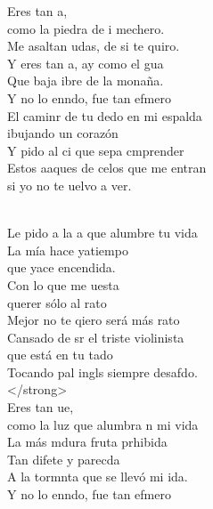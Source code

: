 \begin{cancion}%
	Eres tan a, \\
	como la piedra de i mechero.\\
	Me asaltan udas, de si te quiro.\\
	Y eres tan a, ay como el gua \\
	Que baja ibre de la monaña.\\
	Y no lo enndo, fue tan efmero \\
	El caminr de tu dedo en mi espalda \\
	ibujando un corazón\\
	Y pido al ci que sepa cmprender\\
	Estos aaques de celos que me entran\\
	si yo no te uelvo a ver.\\\jump\\
	\begin{chorus}%
	Le pido a la a que alumbre tu vida\\
	La mía hace yatiempo \\
que yace encendida.\\
	Con lo que me uesta \\
querer sólo al rato\\
	Mejor no te qiero será más rato\\
	Cansado de sr el triste violinista \\
	que está en tu tado\\
	Tocando pal ingls siempre desafdo. \\
 </strong>\\
	Eres tan ue, \\
	como la luz que alumbra n mi vida\\
	La más mdura fruta prhibida\\
	Tan difete y parecda\\
	A la tormnta que se llevó mi ida.\\
	Y no lo enndo, fue tan efmero \\

\end{chorus}
\end{cancion}
